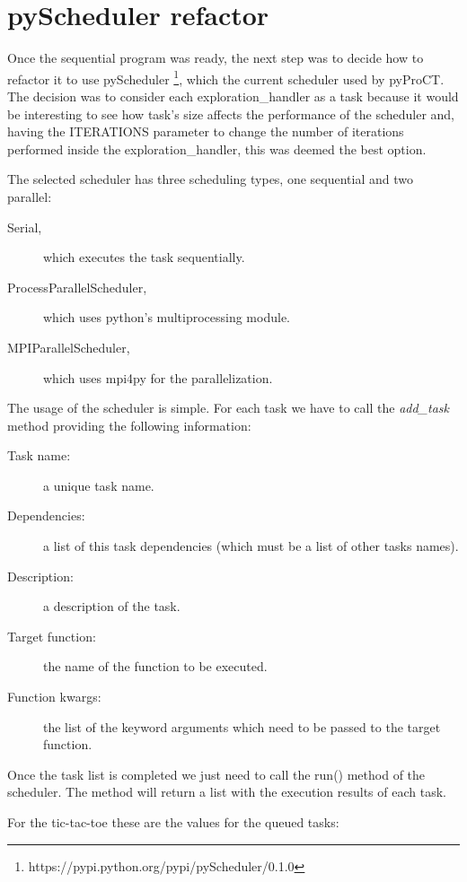 \section{pyScheduler refactor}

Once the sequential program was ready, the next step was to decide how to refactor it to use pyScheduler \footnote{https://pypi.python.org/pypi/pyScheduler/0.1.0}, which the current scheduler used by pyProCT. The decision was to consider each exploration\_handler as a task because it would be interesting to see how task's size affects the performance of the scheduler and, having the ITERATIONS parameter to change the number of iterations performed inside the exploration\_handler, this was deemed the best option. 

The selected scheduler has three scheduling types, one sequential and two parallel: 

\begin{description}
\item [Serial,] which executes the task sequentially.
\item [ProcessParallelScheduler,] which uses python's multiprocessing module.
\item [MPIParallelScheduler,] which uses mpi4py for the parallelization.
\end{description}

The usage of the scheduler is simple. For each task we have to call the \textit{add\_task} method providing the following information:

\begin{description}
\item [Task name:] a unique task name.
\item [Dependencies:] a list of this task dependencies (which must be a list of other tasks names).
\item [Description:] a description of the task.
\item [Target function:] the name of the function to be executed.
\item [Function kwargs:] the list of the keyword arguments which need to be passed to the target function.
\end{description}

Once the task list is completed we just need to call the run() method of the scheduler. The method will return a list with the execution results of each task.

For the tic-tac-toe these are the values for the queued tasks:

